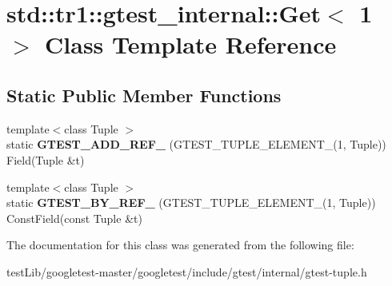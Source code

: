 \hypertarget{classstd_1_1tr1_1_1gtest__internal_1_1Get_3_011_01_4}{}\section{std\+:\+:tr1\+:\+:gtest\+\_\+internal\+:\+:Get$<$ 1 $>$ Class Template Reference}
\label{classstd_1_1tr1_1_1gtest__internal_1_1Get_3_011_01_4}
\subsection*{Static Public Member Functions}
\begin{DoxyCompactItemize}
\item 
\mbox{\label{classstd_1_1tr1_1_1gtest__internal_1_1Get_3_011_01_4_a52b2f5d2bc283d76a3e8dede84dba154}} 
{\footnotesize template$<$class Tuple $>$ }\\static {\bfseries G\+T\+E\+S\+T\+\_\+\+A\+D\+D\+\_\+\+R\+E\+F\+\_\+} (G\+T\+E\+S\+T\+\_\+\+T\+U\+P\+L\+E\+\_\+\+E\+L\+E\+M\+E\+N\+T\+\_\+(1, Tuple)) Field(Tuple \&t)
\item 
\mbox{\label{classstd_1_1tr1_1_1gtest__internal_1_1Get_3_011_01_4_a481a2bf839c758408d46a1d0d41ff8f4}} 
{\footnotesize template$<$class Tuple $>$ }\\static {\bfseries G\+T\+E\+S\+T\+\_\+\+B\+Y\+\_\+\+R\+E\+F\+\_\+} (G\+T\+E\+S\+T\+\_\+\+T\+U\+P\+L\+E\+\_\+\+E\+L\+E\+M\+E\+N\+T\+\_\+(1, Tuple)) Const\+Field(const Tuple \&t)
\end{DoxyCompactItemize}


The documentation for this class was generated from the following file\+:\begin{DoxyCompactItemize}
\item 
test\+Lib/googletest-\/master/googletest/include/gtest/internal/gtest-\/tuple.\+h\end{DoxyCompactItemize}
